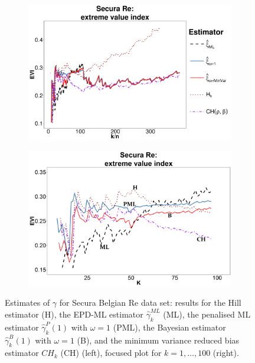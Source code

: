 \begin{figure}[h]
	\centering
	\begin{subfigure}[h]{0.45\textwidth}
		\includegraphics[width=\textwidth]{./plots/paper1/SecuraEVI.png}
	\end{subfigure}
	\hspace{\fill}
	\begin{subfigure}[h]{0.45\textwidth}
		\includegraphics[width=\textwidth]{./plots/paper1/cutSecuraEVI.png}
	\end{subfigure}
	\caption{\footnotesize Estimates of  $\gamma$ for Secura Belgian Re data set: results for the Hill estimator (H), the EPD-ML estimator $\hat{\gamma}_{k}^{ML}$ (ML), the penalised ML estimator $\hat{\gamma}^P_{k}(1)$ with $\omega=1$ (PML), the Bayesian estimator $\hat{\gamma}^B_{k}(1)$ with $\omega=1$ (B), and the minimum variance reduced bias estimator $CH_k$ (CH) (left), focused plot for $k=1,\ldots,100$ (right).}
	\label{Secura} 	
\end{figure}
\\
